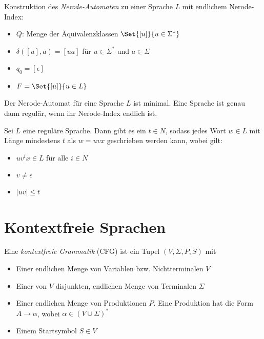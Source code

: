 \documentclass{cheat-sheet}
\begin{document}
\begin{alg}
Konstruktion des \emph{Nerode-Automaten} zu einer Sprache $L$ mit endlichem Nerode-Index:
\end{alg}

\begin{itemize}
  \item $Q$: Menge der Äquivalenzklassen $\Set{[u]}{u \in \Sigma^{*}}$
  \item $\delta([u], a) = [ua]$ für $u \in \Sigma^{*}$ und $a \in \Sigma$
  \item $q_{0} = [ \epsilon ]$
  \item $F = \Set{ [u] }{ u \in L }$
\end{itemize}

\begin{bem}
Der Nerode-Automat für eine Sprache $L$ ist minimal. Eine Sprache ist genau dann regulär, wenn ihr Nerode-Index endlich ist.
\end{bem}

\begin{satz}
Sei $L$ eine reguläre Sprache. Dann gibt es ein $t \in N$, sodass jedes Wort $w \in L$ mit Länge mindestens $t$ als $w = uvx$ geschrieben werden kann, wobei gilt:
\end{satz}

\begin{itemize}
  \item $uv^{i}x \in L$ für alle $i \in N$
  \item $v \neq \epsilon$
  \item $|uv| \le t$
\end{itemize}



\section{Kontextfreie Sprachen}

\begin{definition}
Eine \emph{kontextfreie Grammatik} (CFG) ist ein Tupel $(V, \Sigma, P, S)$ mit

\begin{itemize}
  \item Einer endlichen Menge von Variablen bzw. Nichtterminalen $V$
  \item Einer von $V$ disjunkten, endlichen Menge von Terminalen $\Sigma$
  \item Einer endlichen Menge von Produktionen $P$. Eine Produktion hat die Form $A \longrightarrow \alpha$, wobei $\alpha \in (V \cup \Sigma)^{*}$
  \item Einem Startsymbol $S \in V$
\end{itemize}
\end{definition}
\end{document}
